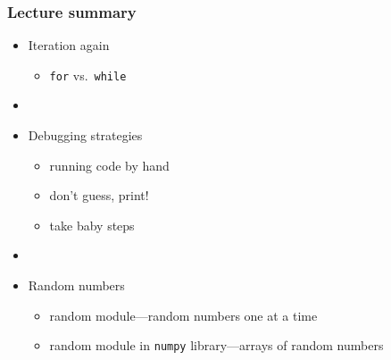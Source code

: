 \documentclass[english,14pt]{beamer}
\begin{document}

\begin{frame}[fragile]

\frametitle{Lecture summary}
\begin{itemize}
	\item Iteration again
	\begin{itemize}
		\item \texttt{for} vs.~\texttt{while}
	\end{itemize}

	\item[]
	
	\item Debugging strategies
	\begin{itemize}
		\item running code by hand
		\item don't guess, print!
		\item take baby steps
	\end{itemize}

	\item[]
	
	\item Random numbers
		\begin{itemize}
			\item random module---random numbers one at a time %
			\item random module in \texttt{numpy} library---arrays of random numbers %
		\end{itemize}
		
\end{itemize}

\end{frame}
\end{document}
